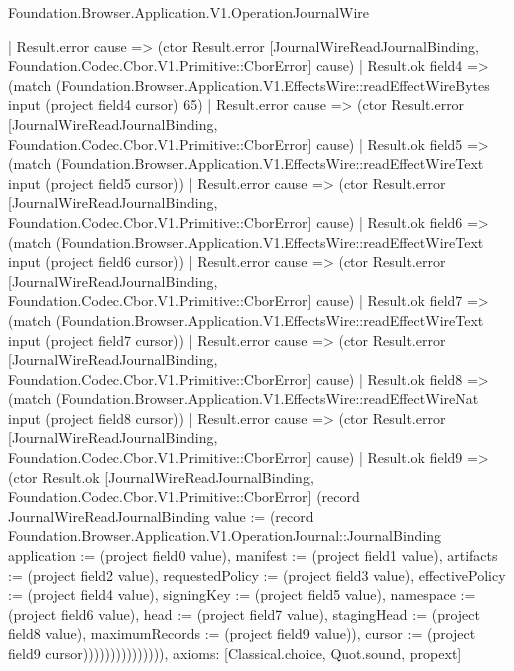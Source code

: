 \begin{lexlean}{Foundation.Browser.Application.V1.OperationJournalWire}
\begin{semanticmodule}
{                | Result.error cause => (ctor Result.error [JournalWireReadJournalBinding, Foundation.Codec.Cbor.V1.Primitive::CborError] cause)
                | Result.ok field4 => (match (Foundation.Browser.Application.V1.EffectsWire::readEffectWireBytes input (project field4 cursor) 65)
                  | Result.error cause => (ctor Result.error [JournalWireReadJournalBinding, Foundation.Codec.Cbor.V1.Primitive::CborError] cause)
                  | Result.ok field5 => (match (Foundation.Browser.Application.V1.EffectsWire::readEffectWireText input (project field5 cursor))
                    | Result.error cause => (ctor Result.error [JournalWireReadJournalBinding, Foundation.Codec.Cbor.V1.Primitive::CborError] cause)
                    | Result.ok field6 => (match (Foundation.Browser.Application.V1.EffectsWire::readEffectWireText input (project field6 cursor))
                      | Result.error cause => (ctor Result.error [JournalWireReadJournalBinding, Foundation.Codec.Cbor.V1.Primitive::CborError] cause)
                      | Result.ok field7 => (match (Foundation.Browser.Application.V1.EffectsWire::readEffectWireText input (project field7 cursor))
                        | Result.error cause => (ctor Result.error [JournalWireReadJournalBinding, Foundation.Codec.Cbor.V1.Primitive::CborError] cause)
                        | Result.ok field8 => (match (Foundation.Browser.Application.V1.EffectsWire::readEffectWireNat input (project field8 cursor))
                          | Result.error cause => (ctor Result.error [JournalWireReadJournalBinding, Foundation.Codec.Cbor.V1.Primitive::CborError] cause)
                          | Result.ok field9 => (ctor Result.ok [JournalWireReadJournalBinding, Foundation.Codec.Cbor.V1.Primitive::CborError] (record JournalWireReadJournalBinding {value := (record Foundation.Browser.Application.V1.OperationJournal::JournalBinding {application := (project field0 value), manifest := (project field1 value), artifacts := (project field2 value), requestedPolicy := (project field3 value), effectivePolicy := (project field4 value), signingKey := (project field5 value), namespace := (project field6 value), head := (project field7 value), stagingHead := (project field8 value), maximumRecords := (project field9 value)}), cursor := (project field9 cursor)})))))))))))))),
  axioms: [Classical.choice, Quot.sound, propext]
}


\end{semanticmodule}
\end{lexlean}
